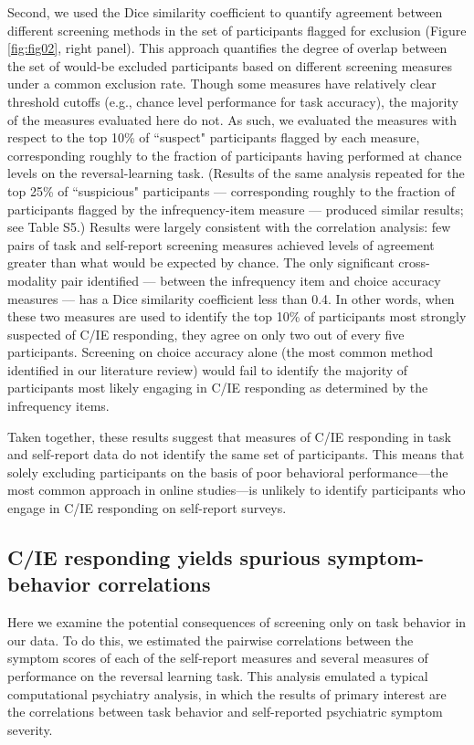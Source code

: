 \documentclass[a4paper,notitlepage,12pt]{article}
\begin{document}
Second, we used the Dice similarity coefficient to quantify agreement between different screening methods in the set of participants flagged for exclusion (Figure \ref{fig:fig02}, right panel). This approach quantifies the degree of overlap between the set of would-be excluded participants based on different screening measures under a common exclusion rate. Though some measures have relatively clear threshold cutoffs (e.g., chance level performance for task accuracy), the majority of the measures evaluated here do not. As such, we evaluated the measures with respect to the top 10\% of ``suspect" participants flagged by each measure, corresponding roughly to the fraction of participants having performed at chance levels on the reversal-learning task. (Results of the same analysis repeated for the top 25\% of ``suspicious" participants --- corresponding roughly to the fraction of participants flagged by the infrequency-item measure --- produced similar results; see Table S5.) Results were largely consistent with the correlation analysis: few pairs of task and self-report screening measures achieved levels of agreement greater than what would be expected by chance. The only significant cross-modality pair identified --- between the infrequency item and choice accuracy measures --- has a Dice similarity coefficient less than 0.4. In other words, when these two measures are used to identify the top 10\% of participants most strongly suspected of C/IE responding, they agree on only two out of every five participants. Screening on choice accuracy alone (the most common method identified in our literature review) would fail to identify the majority of participants most likely engaging in C/IE responding as determined by the infrequency items.

Taken together, these results suggest that measures of C/IE responding in task and self-report data do not identify the same set of participants. This means that solely excluding participants on the basis of poor behavioral performance---the most common approach in online studies---is unlikely to identify participants who engage in C/IE responding on self-report surveys. 

\subsection*{C/IE responding yields spurious symptom-behavior correlations}

Here we examine the potential consequences of screening only on task behavior in our data. To do this, we estimated the pairwise correlations between the symptom scores of each of the self-report measures and several measures of performance on the reversal learning task. This analysis emulated a typical computational psychiatry analysis, in which the results of primary interest are the correlations between task behavior and self-reported psychiatric symptom severity.
\end{document}
